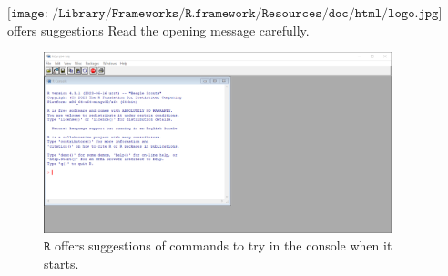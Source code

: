 \documentclass[
  ignorenonframetext,
]{beamer}
\begin{document}
\begin{frame}{\(\texttt{[image: /Library/Frameworks/R.framework/Resources/doc/html/logo.jpg]}\)
offers suggestions}
\protect\hypertarget{includegraphicsheight1emlibraryframeworksr.frameworkresourcesdochtmllogo.jpg-offers-suggestions}{}
Read the opening message carefully.

\begin{figure}
\centering
\includegraphics[width=0.9\textwidth,height=\textheight]{images/R-screenshot-win-default.png}
\caption{\(\texttt{R}\) offers suggestions of commands to try in the
console when it starts.}
\end{figure}
\end{frame}
\end{document}
